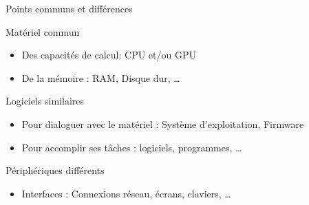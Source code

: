 \begin{frame}{Points communs et différences}
  \begin{block}{Matériel commun}
    \begin{itemize}
    \item Des capacités de calcul: CPU et/ou GPU
    \item De la mémoire : RAM, Disque dur, \dots
    \end{itemize}
  \end{block}
  \begin{block}{Logiciels similaires}
    \begin{itemize}
    \item Pour dialoguer avec le matériel : Système d'exploitation, Firmware
    \item Pour accomplir ses tâches : logiciels, programmes, \dots
    \end{itemize}
  \end{block}
  \begin{alertblock}{Périphériques différents}
    \begin{itemize}
    \item Interfaces : Connexions réseau, écrans, claviers, \dots
    \end{itemize}
  \end{alertblock}
\end{frame}
